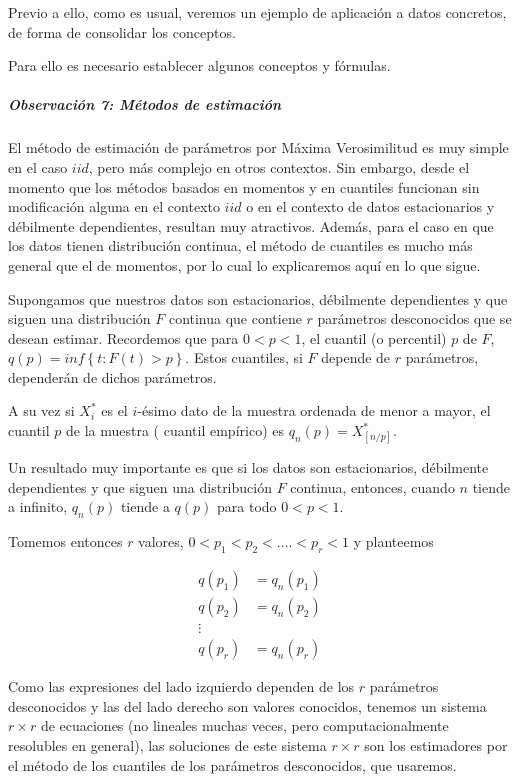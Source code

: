 \documentclass[
  12pt]{article}
\begin{document}
Previo a ello, como es usual, veremos un ejemplo de aplicación a datos
concretos, de forma de consolidar los conceptos.

Para ello es necesario establecer algunos conceptos y fórmulas.

\subparagraph{Observación 7: Métodos de
estimación}\label{observaciuxf3n-7-muxe9todos-de-estimaciuxf3n}

El método de estimación de parámetros por Máxima Verosimilitud es muy
simple en el caso \(iid\), pero más complejo en otros contextos. Sin
embargo, desde el momento que los métodos basados en momentos y en
cuantiles funcionan sin modificación alguna en el contexto \(iid\) o en
el contexto de datos estacionarios y débilmente dependientes, resultan
muy atractivos. Además, para el caso en que los datos tienen
distribución continua, el método de cuantiles es mucho más general que
el de momentos, por lo cual lo explicaremos aquí en lo que sigue.

Supongamos que nuestros datos son estacionarios, débilmente dependientes
y que siguen una distribución \(F\) continua que contiene \(r\)
parámetros desconocidos que se desean estimar. Recordemos que para
\(0<p<1\), el cuantil (o percentil) \(p\) de \(F\),
\(q(p)= inf \left \{t:F(t)>p \right \}\). Estos cuantiles, si \(F\)
depende de \(r\) parámetros, dependerán de dichos parámetros.

A su vez si \(X_i^*\) es el \(i\)-ésimo dato de la muestra ordenada de
menor a mayor, el cuantil \(p\) de la muestra ( cuantil empírico) es
\(q_n(p)= X_{[n/p]}^*\).

Un resultado muy importante es que si los datos son estacionarios,
débilmente dependientes y que siguen una distribución \(F\) continua,
entonces, cuando \(n\) tiende a infinito, \(q_n(p)\) tiende a \(q(p)\)
para todo \(0<p<1\).

Tomemos entonces \(r\) valores, \(0<p_1<p_2<....<p_r<1\) y planteemos

\begin{align*}
q(p_1)&=q_n(p_1)\\
q(p_2)&=q_n(p_2)\\
\vdots \\
q(p_r)&=q_n(p_r)
\end{align*}

Como las expresiones del lado izquierdo dependen de los \(r\) parámetros
desconocidos y las del lado derecho son valores conocidos, tenemos un
sistema \(r\times r\) de ecuaciones (no lineales muchas veces, pero
computacionalmente resolubles en general), las soluciones de este
sistema \(r\times r\) son los estimadores por el método de los cuantiles
de los parámetros desconocidos, que usaremos.
\end{document}
